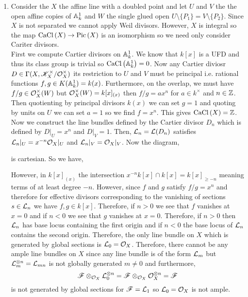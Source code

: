\documentclass[12pt]{article}
\begin{document}
\begin{enumerate}
\item Consider the $X$ the affine line with a doubled point and let $U$ and $V$ the the open affine copies of $\mathbb{A}^1_k$ and $W$ the single glued open $U \setminus \{ P_1 \} = V \setminus \{ P_2 \}$. Since $X$ is not separated we cannot apply Weil divisors. However, $X$ is integral so the map $\mathrm{CaCl}\left( X \right) \to \mathrm{Pic} \left( X \right)$ is an isomorphism so we need only consider Cariter divisors. 
\bigskip\\
First we compute Cartier divisors on $\mathbb{A}^1_k$. We know that $k[x]$ is a UFD and thus its class group is trivial so $\mathrm{CaCl}\left( \mathbb{A}^1_k \right) = 0$. Now any Cartier diviosr $D \in \Gamma(X, \mathscr{K}^\times_X / \mathcal{O}_{X}^\times)$ its restriction to $U$ and $V$ must be principal i.e. rational functions $f, g \in K(\mathbb{A}^1_k) = k(x)$. Furthermore, on the overlap, we must have $f/g \in \mathcal{O}_{X}^\times(W)$ but $\mathcal{O}_{X}^\times(W) = k[x]_{(x)}$ then $f / g = a x^n$ for $a \in k^\times$ and $n \in \mathbb{Z}$. Then quotienting by principal divisors $k(x)$ we can set $g = 1$ and quoting by units on $U$ we can set $a = 1$ so we find $f = x^n$. This gives $\mathrm{CaCl}\left( X \right) = \mathbb{Z}$. 
\bigskip\\
Now we construct the line bundles defined by the Cartier divisor $D_n$ which is defined by $D|_U = x^n$ and $D|_V = 1$. Then, $\mathcal{L}_n = \mathcal{L}(D_n)$ satisfies $\mathcal{L}_n|_U = x^{-n} \mathcal{O}_{X}|_U$ and $\mathcal{L}_n|_V = \mathcal{O}_{X}|_V$.     
Now the diagram,
\begin{center}
\end{center}
is cartesian. So we have,
\begin{center}
\end{center}
However, in $k[x]_{(x)}$ the intersection $x^{-n} k[x] \cap k[x] = k[x]_{\ge -n}$ meaning terms of at least degree $-n$. However, since $f$ and $g$ satisfy $f/g = x^n$ and therefore for effective divisors corresponding to the vanishing of sections $s \in \mathcal{L}_n$ we have $f,g \in k[x]$. Therefore, if $n > 0$ we see that $f$ vanishes at $x = 0$ and if $n < 0$ we see that $g$ vanishes at $x = 0$. Therefore, if $n > 0$ then $\mathcal{L}_n$ has base locus containing the first origin and if $n < 0$ the base locus of $\mathcal{L}_n$ contains the second origin. Therefore, the only line bundle on $X$ which is generated by global sections is $\mathcal{L}_0 = \mathcal{O}_{X}$. Therefore, there cannot be any ample line bundles on $X$ since any line bundle is of the form $\mathcal{L}_m$ but $\mathcal{L}_m^{\otimes n} = \mathcal{L}_{mn}$ is not globally generated $m \neq 0$ and furthermore, 
\[ \mathscr{F} \otimes_{\mathcal{O}_{X}} \mathcal{L}_0^{\otimes n} = \mathscr{F} \otimes_{\mathcal{O}_{X}} \mathcal{O}_{X}^{\otimes n} = \mathscr{F} \]
is not generated by global sections for $\mathscr{F} = \mathcal{L}_1$ so $\mathcal{L}_0 = \mathcal{O}_{X}$ is not ample. 
\end{enumerate}
\end{document}
